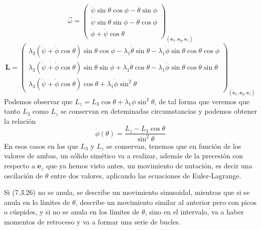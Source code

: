 \begin{equation} \label{6.1.1}
    \vec{\omega} = \left(\begin{matrix}
    \dot{\psi}\sin\theta\cos\phi - \dot{\theta}\sin\phi\\
    \dot{\psi}\sin\theta\sin\phi - \dot{\theta}\cos\phi\\
    \dot{\phi} + \dot{\psi}\cos\theta
    \end{matrix}\right)_{(\mathbf{e}_x,\mathbf{e}_y,\mathbf{e}_z)}
\end{equation}
\begin{equation} \label{6.1.1}
    \mathbf{L} = \left(\begin{matrix}
    \lambda_3(\dot{\psi}+\dot{\phi}\cos\theta)\sin\theta \cos\phi-\lambda_1\dot{\theta}\sin\theta -\lambda_1 \dot{\phi} \sin\theta\cos\theta\cos\phi\\
    \lambda_3(\dot{\psi}+\dot{\phi}\cos\theta)\sin\theta \sin\phi+\lambda_1\dot{\theta}\cos\theta-\lambda_1 \dot{\phi} \sin\theta\cos\theta\sin\theta\\
    \lambda_3(\dot{\psi}+\dot{\phi}\cos\theta)\cos\theta+\lambda_1 \dot{\phi} \sin^2\theta
    \end{matrix}\right)_{(\mathbf{e}_x,\mathbf{e}_y,\mathbf{e}_z)}
\end{equation}
Podemos observar que $L_z = L_3 \cos\theta + \lambda_1 \dot{\phi} \sin^2\theta$, de tal forma que veremos que tanto $L_3$ como $L_z$ se conservan en deteminadas circumstancias y podemos obtener la relación
\begin{equation} \label{6.1.1}
    \dot{\phi}(\theta) = \frac{L_z - L_3 \cos\theta}{\sin^2\theta}
\end{equation}
En esos casos en los que $L_3$ y $L_z$ se conservan, tenemos que en función de los valores de ambas, un sólido simético va a realizar, además de la precesión con respecto a $\mathbf{e}_z$ que ya hemos visto antes, un movimiento de nutación, es decir una oscilación de $\theta$ entre dos valores, aplicando las ecuaciones de Euler-Lagrange.

Si (7.3.26) no se anula, se describe un movimiento sinusoidal, mientras que si se anula en lo límites de $\theta$, describe un movimiento similar al anterior pero con picos o cúspides, y si no se anula en los límites de $\theta$, sino en el intervalo, va a haber momentos de retroceso y va a formar una serie de bucles.
